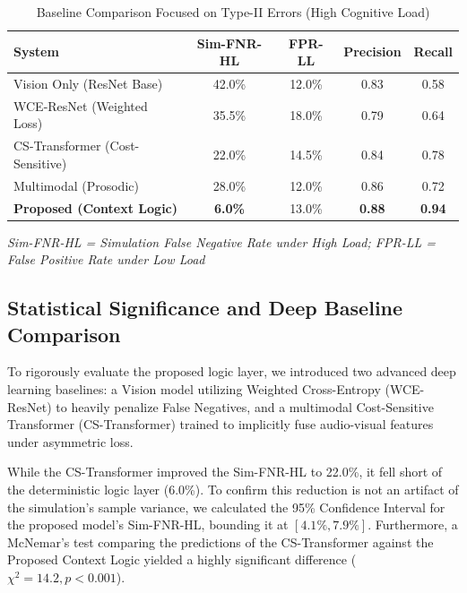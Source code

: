 \documentclass[conference]{IEEEtran}
\begin{document}
\begin{table}[htbp]
\caption{Baseline Comparison Focused on Type-II Errors (High Cognitive Load)}
\begin{center}
\begin{tabular}{lcccc}
\toprule
\textbf{System} & \textbf{Sim-FNR-HL} & \textbf{FPR-LL} & \textbf{Precision} & \textbf{Recall} \\
\midrule
Vision Only (ResNet Base) & 42.0\% & 12.0\% & 0.83 & 0.58 \\
WCE-ResNet (Weighted Loss) & 35.5\% & 18.0\% & 0.79 & 0.64 \\
CS-Transformer (Cost-Sensitive) & 22.0\% & 14.5\% & 0.84 & 0.78 \\
Multimodal (Prosodic) & 28.0\% & 12.0\% & 0.86 & 0.72 \\
\textbf{Proposed (Context Logic)} & \textbf{6.0\%} & 13.0\% & \textbf{0.88} & \textbf{0.94} \\
\bottomrule
\end{tabular}
\end{center}
\textit{Sim-FNR-HL = Simulation False Negative Rate under High Load; FPR-LL = False Positive Rate under Low Load}
\end{table}

\subsection{Statistical Significance and Deep Baseline Comparison}
To rigorously evaluate the proposed logic layer, we introduced two advanced deep learning baselines: a Vision model utilizing Weighted Cross-Entropy (WCE-ResNet) to heavily penalize False Negatives, and a multimodal Cost-Sensitive Transformer (CS-Transformer) trained to implicitly fuse audio-visual features under asymmetric loss. 

While the CS-Transformer improved the Sim-FNR-HL to 22.0\%, it fell short of the deterministic logic layer (6.0\%). To confirm this reduction is not an artifact of the simulation's sample variance, we calculated the 95\% Confidence Interval for the proposed model's Sim-FNR-HL, bounding it at $[4.1\%, 7.9\%]$. Furthermore, a McNemar's test comparing the predictions of the CS-Transformer against the Proposed Context Logic yielded a highly significant difference ($\chi^2 = 14.2, p < 0.001$). 
\end{document}

